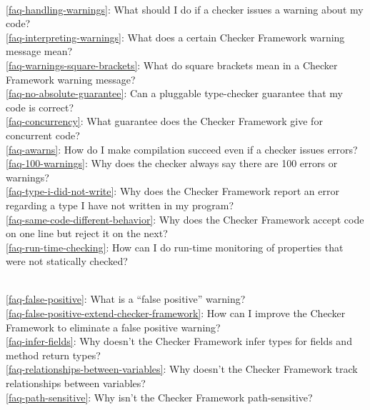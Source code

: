 \\ \ref{faq-handling-warnings}: What should I do if a checker issues a warning about my code?
\\ \ref{faq-interpreting-warnings}: What does a certain Checker Framework warning message mean?
\\ \ref{faq-warnings-square-brackets}: What do square brackets mean in a Checker Framework warning message?
\\ \ref{faq-no-absolute-guarantee}: Can a pluggable type-checker guarantee that my code is correct?
\\ \ref{faq-concurrency}: What guarantee does the Checker Framework give for concurrent code?
\\ \ref{faq-awarns}: How do I make compilation succeed even if a checker issues errors?
\\ \ref{faq-100-warnings}: Why does the checker always say there are 100 errors or warnings?
\\ \ref{faq-type-i-did-not-write}: Why does the Checker Framework report an error regarding a type I have not written in my program?
\\ \ref{faq-same-code-different-behavior}: Why does the Checker Framework accept code on one line but reject it on the next?
\\ \ref{faq-run-time-checking}: How can I do run-time monitoring of properties that were not statically checked?

\\ \ref{faq-false-positive}: What is a ``false positive'' warning?
\\ \ref{faq-false-positive-extend-checker-framework}: How can I improve the Checker Framework to eliminate a false positive warning?
\\ \ref{faq-infer-fields}: Why doesn't the Checker Framework infer types for fields and method return types?
\\ \ref{faq-relationships-between-variables}: Why doesn't the Checker Framework track relationships between variables?
\\ \ref{faq-path-sensitive}: Why isn't the Checker Framework path-sensitive?

